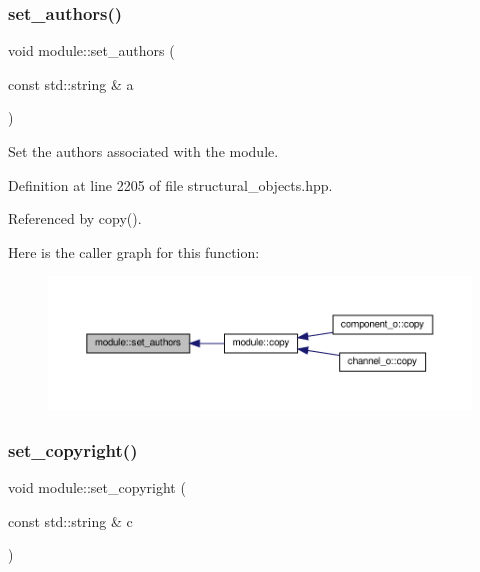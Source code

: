 \subsubsection{\texorpdfstring{set\+\_\+authors()}{set\_authors()}}
{\footnotesize\ttfamily void module\+::set\+\_\+authors (\begin{DoxyParamCaption}\item[{const std\+::string \&}]{a }\end{DoxyParamCaption})\hspace{0.3cm}{\ttfamily [inline]}}



Set the authors associated with the module. 



Definition at line 2205 of file structural\+\_\+objects.\+hpp.



Referenced by copy().

Here is the caller graph for this function\+:
\nopagebreak
\begin{figure}[H]
\begin{center}
\leavevmode
\includegraphics[width=350pt]{d0/dd3/classmodule_a765b2eebf434191d207faa31dac7ea57_icgraph}
\end{center}
\end{figure}
\mbox{\label{classmodule_a31b532a300bbc2b50dd505bb1cedb26e}} 
\subsubsection{\texorpdfstring{set\+\_\+copyright()}{set\_copyright()}}
{\footnotesize\ttfamily void module\+::set\+\_\+copyright (\begin{DoxyParamCaption}\item[{const std\+::string \&}]{c }\end{DoxyParamCaption})\hspace{0.3cm}{\ttfamily [inline]}}



